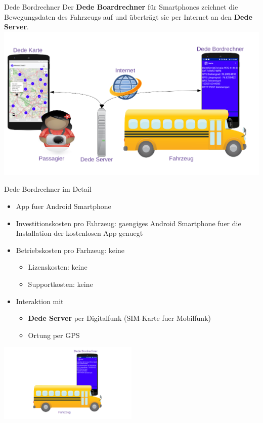 
\begin{frame}{Dede Bordrechner}
  Der \textbf{Dede Boardrechner} für Smartphones zeichnet die Bewegungsdaten des Fahrzeugs auf und überträgt sie per Internet an den \textbf{Dede Server}.
  \includegraphics[width=\paperwidth]{dede/dede-concept}
\end{frame}

\begin{frame}{Dede Bordrechner im Detail}
  \begin{itemize}
  \item App fuer Android Smartphone
  \item Investitionskosten pro Fahrzeug: gaengiges Android Smartphone fuer die Installation der kostenlosen App genuegt
  \item Betriebskosten pro Farhzeug: keine
    \begin{itemize}
    \item Lizenskosten: keine
    \item Supportkosten: keine
    \end{itemize}
  \item Interaktion mit
    \begin{itemize}
    \item \textbf{Dede Server} per Digitalfunk (SIM-Karte fuer Mobilfunk)
    \item Ortung per GPS
    \end{itemize}
  \end{itemize}
  \includegraphics[width=0.5\textwidth]{otm-june-2-2021/dede-on-board-computer-june-04.png}
\end{frame}

